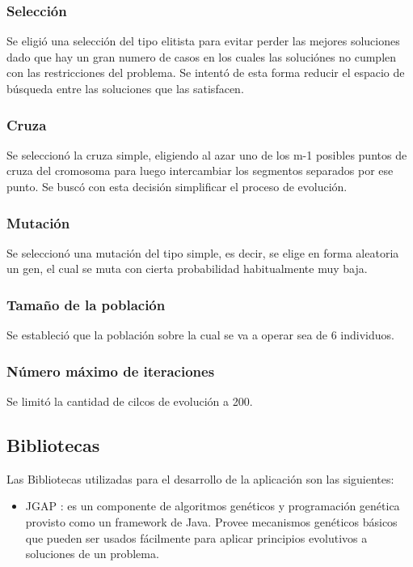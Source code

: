 \documentclass[pdftex,a4paper,10.5pt]{article}
\begin{document}
\subsubsection{Selecci\'on}
Se eligi\'o una selecci\'on del tipo elitista para evitar perder las mejores soluciones dado que hay un gran numero de casos en los cuales las soluci\'ones no cumplen con las restricciones del problema. Se intent\'o de esta forma reducir el espacio de b\'usqueda entre las soluciones que las satisfacen.

\subsubsection{Cruza}
Se seleccion\'o la cruza simple, eligiendo al azar uno de los m-1 posibles puntos de cruza del cromosoma para luego intercambiar los segmentos separados por ese punto. Se busc\'o con esta decisi\'on simplificar el proceso de evoluci\'on.

\subsubsection{Mutaci\'on}
Se seleccion\'o una mutaci\'on del tipo simple, es decir, se elige en forma aleatoria un gen, el cual se muta con cierta probabilidad habitualmente muy baja.

\subsubsection{Tama\~no de la poblaci\'on}
Se estableci\'o que la poblaci\'on sobre la cual se va a operar sea de 6 individuos.
 
\subsubsection{N\'umero m\'aximo de iteraciones}
Se limit\'o la cantidad de cilcos de evoluci\'on a 200.


\subsection{Bibliotecas}
Las Bibliotecas utilizadas para el desarrollo de la aplicaci\'on son las
siguientes:
\begin{itemize}

\item JGAP : es un componente de algoritmos gen\'eticos y programaci\'on gen\'etica provisto como un framework de Java. Provee mecanismos gen\'eticos b\'asicos que pueden ser usados f\'acilmente para aplicar principios evolutivos a soluciones de un problema.

\end{itemize}
       
\end{document}
